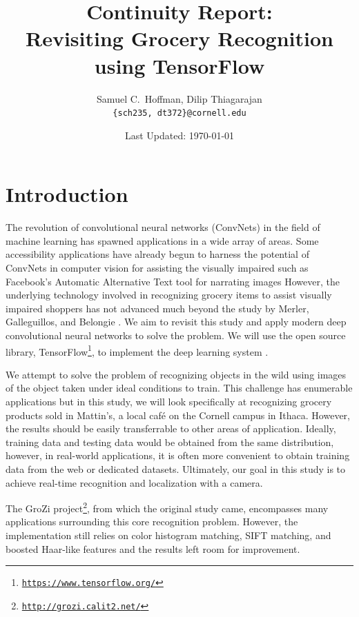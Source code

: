 \documentclass[letterpaper, 11pt]{article}
\title{\LARGE\bfseries Continuity Report:\\Revisiting Grocery Recognition using TensorFlow}
\author{Samuel C.~Hoffman, Dilip Thiagarajan\\
		\texttt{\{sch235, dt372\}@cornell.edu}}
\date{Last Updated: \today}
\begin{document}
\maketitle

\vspace*{-22pt}

\section{Introduction}


The revolution of convolutional neural networks (ConvNets) in the field of machine learning has spawned applications in a wide array of areas. Some accessibility applications have already begun to harness the potential of ConvNets in computer vision for assisting the visually impaired such as Facebook's Automatic Alternative Text tool for narrating images \cite{fair16} However, the underlying technology involved in recognizing grocery items to assist visually impaired shoppers has not advanced much beyond the study by Merler, Galleguillos, and Belongie \cite{merler07}. We aim to revisit this study and apply modern deep convolutional neural networks to solve the problem. We will use the open source library, TensorFlow\footnote{\texttt{\href{https://www.tensorflow.org/}{https://www.tensorflow.org/}}}, to implement the deep learning system \cite{tensorflow15}.

We attempt to solve the problem of recognizing objects in the wild using images of the object taken under ideal conditions to train. This challenge has enumerable applications but in this study, we will look specifically at recognizing grocery products sold in Mattin's, a local caf\'{e} on the Cornell campus in Ithaca. However, the results should be easily transferrable to other areas of application. Ideally, training data and testing data would be obtained from the same distribution, however, in real-world applications, it is often more convenient to obtain training data from the web or dedicated datasets. Ultimately, our goal in this study is to achieve real-time recognition and localization with a camera.

The GroZi project\footnote{\texttt{\href{http://grozi.calit2.net/}{http://grozi.calit2.net/}}}, from which the original study came, encompasses many applications surrounding this core recognition problem. However, the implementation still relies on color histogram matching, SIFT matching, and boosted Haar-like features and the results left room for improvement.
\end{document}
